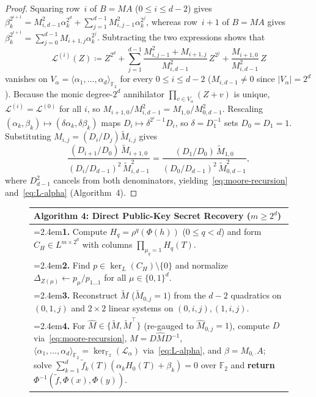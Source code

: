 \documentclass[11pt,a4paper]{article}
\theoremstyle{definition}
\theoremstyle{remark}
\newcommand{\Ftwo}{\mathbb{F}_2}
\newcommand{\algstep}[2]{\hangindent=2.4em\hangafter=1\hspace*{1.1em}\textbf{#1.} #2}
\begin{document}
\begin{proof}
Squaring row~$i$ of $B = M A$ ($0 \le i \le d - 2$) gives $\beta_k^{2^{i+1}} = M_{i,d-1}^2 \alpha_k^{2^d} + \sum_{j=1}^{d-1} M_{i,j-1}^2 \alpha_k^{2^j}$, whereas row~$i+1$ of $B = M A$ gives $\beta_k^{2^{i+1}} = \sum_{j=0}^{d-1} M_{i+1,j} \alpha_k^{2^j}$. Subtracting the two expressions shows that
\[
    \mathcal{L}^{(i)}(Z) \coloneqq Z^{2^d} + \sum_{j=1}^{d-1} \frac{M_{i,j-1}^2 + M_{i+1,j}}{M_{i,d-1}^2}\, Z^{2^j} + \frac{M_{i+1,0}}{M_{i,d-1}^2}\, Z
\]
vanishes on $V_\alpha = \langle \alpha_1, \dots, \alpha_d \rangle_{\Ftwo}$ for every $0 \le i \le d - 2$ ($M_{i,d-1} \neq 0$ since $|V_\alpha| = 2^d$). Because the monic degree-$2^d$ annihilator $\prod_{v \in V_\alpha}(Z + v)$ is unique, $\mathcal{L}^{(i)} = \mathcal{L}^{(0)}$ for all $i$, so $M_{i+1,0} / M_{i,d-1}^2 = M_{1,0} / M_{0,d-1}^2$. Rescaling $(\alpha_k, \beta_k) \mapsto (\delta \alpha_k, \delta \beta_k)$ maps $D_i \mapsto \delta^{2^i - 1} D_i$, so $\delta = D_1^{-1}$ sets $D_0 = D_1 = 1$. Substituting $M_{i,j} = (D_i / D_j) \tilde{M}_{i,j}$ gives
\[
    \frac{(D_{i+1}/D_0)\,\tilde{M}_{i+1,0}}{(D_i / D_{d-1})^2\,\tilde{M}_{i,d-1}^2}
    = \frac{(D_1 / D_0)\,\tilde{M}_{1,0}}{(D_0 / D_{d-1})^2\,\tilde{M}_{0,d-1}^2},
\]
where $D_{d-1}^2$ cancels from both denominators, yielding~\eqref{eq:moore-recursion} and~\eqref{eq:L-alpha} (Algorithm~4).
\end{proof}

\begin{figure}[t]
\centering
\renewcommand{\arraystretch}{1.12}
\begin{tabular}{@{}>{\raggedright\arraybackslash}p{\textwidth}@{}}
\toprule
\textbf{Algorithm 4:} Direct Public-Key Secret Recovery ($m \ge 2^d$) \\
\midrule
\algstep{1}{Compute $H_q = \rho^q(\Phi(h))$ ($0 \le q < d$) and form $C_H \in L^{m \times 2^d}$ with columns $\prod_{\mu_q=1} H_q(T)$.} \\
\algstep{2}{Find $p \in \ker_L(C_H) \setminus \{0\}$ and normalize $\Delta_{Z(\mu)} \leftarrow p_\mu / p_{1\dots 1}$ for all $\mu \in \{0,1\}^d$.} \\
\algstep{3}{Reconstruct $\tilde{M}$ ($\tilde{M}_{0,j}=1$) from the $d-2$ quadratics on $(0,1,j)$ and $2 \times 2$ linear systems on $(0,i,j),(1,i,j)$.} \\
\algstep{4}{For $\hat{M} \in \{\tilde{M}, \tilde{M}^\top\}$ (re-gauged to $\hat{M}_{0,j}=1$), compute $D$ via~\eqref{eq:moore-recursion}, $M = D \hat{M} D^{-1}$, $\langle \alpha_1, \dots, \alpha_d \rangle_{\Ftwo} = \ker_{\Ftwo}(\mathcal{L}_\alpha)$ via~\eqref{eq:L-alpha}, and $\beta = M_{0,\cdot} A$; solve $\sum_{k=1}^d \tilde{f}_k(T)(\alpha_k H_0(T) + \beta_k) = 0$ over $\Ftwo$ and \textbf{return} $\Phi^{-1}(\tilde{f}, \Phi(x), \Phi(y))$.} \\
\bottomrule
\end{tabular}
\end{figure}
\end{document}
